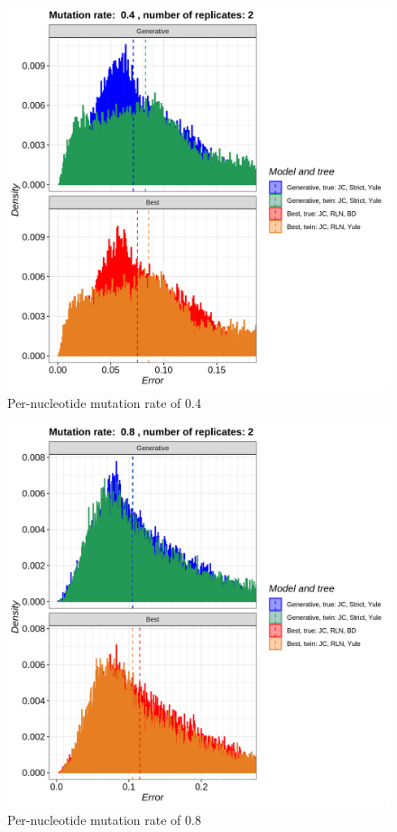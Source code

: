 \begin{figure}[H]
  \includegraphics[width=\textwidth]{pirouette_example_24/errors_6.png}
  \caption{Per-nucleotide mutation rate of 0.4}
\end{figure}

\begin{figure}[H]
  \includegraphics[width=\textwidth]{pirouette_example_24/errors_7.png}
  \caption{Per-nucleotide mutation rate of 0.8}
\end{figure}

